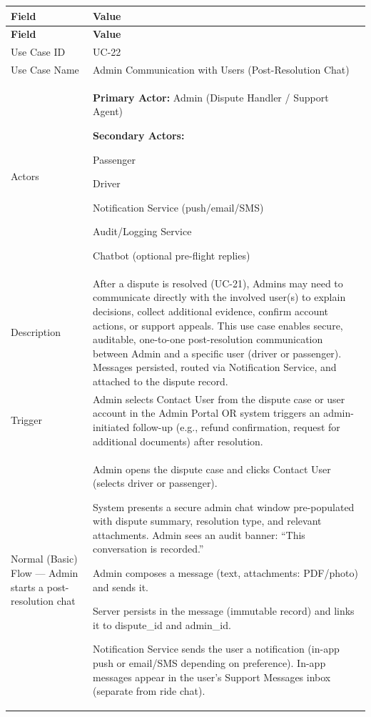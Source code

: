 \begin{longtable}{|p{3.5cm}|p{12cm}|}
\hline
\rowcolor{lightgray!30}
\textbf{Field} & \textbf{Value} \\
\hline
\endfirsthead
\hline
\rowcolor{lightgray!30}
\textbf{Field} & \textbf{Value} \\
\hline
\endhead
\hline
\endfoot
Use Case ID & UC-22 \\
\hline
Use Case Name & Admin Communication with Users (Post-Resolution Chat) \\
\hline
Actors &
\textbf{Primary Actor:} Admin (Dispute Handler / Support Agent)

\textbf{Secondary Actors:}

Passenger

Driver

Notification Service (push/email/SMS)

Audit/Logging Service

Chatbot (optional pre-flight replies) \\
\hline
Description &
After a dispute is resolved (UC-21), Admins may need to communicate directly with the involved user(s) to explain decisions, collect additional evidence, confirm account actions, or support appeals. This use case enables secure, auditable, one-to-one post-resolution communication between Admin and a specific user (driver or passenger). Messages persisted, routed via Notification Service, and attached to the dispute record. \\
\hline
Trigger &
Admin selects Contact User from the dispute case or user account in the Admin Portal OR system triggers an admin-initiated follow-up (e.g., refund confirmation, request for additional documents) after resolution. \\
\hline
Normal (Basic) Flow — Admin starts a post-resolution chat &
Admin opens the dispute case and clicks Contact User (selects driver or passenger).

System presents a secure admin chat window pre-populated with dispute summary, resolution type, and relevant attachments. Admin sees an audit banner: “This conversation is recorded.”

Admin composes a message (text, attachments: PDF/photo) and sends it.

Server persists in the message (immutable record) and links it to dispute\_id and admin\_id.

Notification Service sends the user a notification (in-app push or email/SMS depending on preference). In-app messages appear in the user’s Support Messages inbox (separate from ride chat).


\end{longtable}
